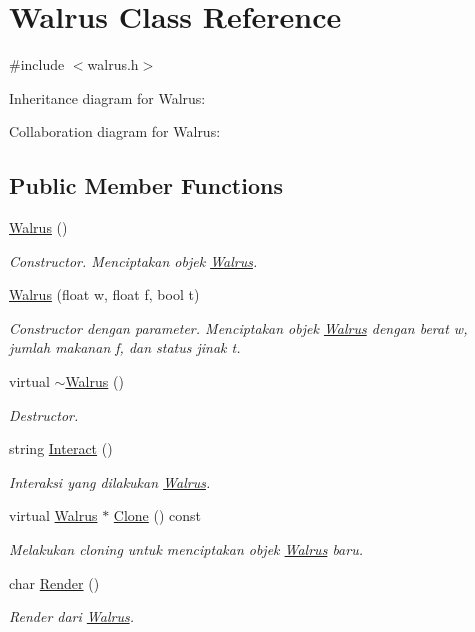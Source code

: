 \hypertarget{classWalrus}{}\section{Walrus Class Reference}
\label{classWalrus}


{\ttfamily \#include $<$walrus.\+h$>$}



Inheritance diagram for Walrus\+:


Collaboration diagram for Walrus\+:
\subsection*{Public Member Functions}
\begin{DoxyCompactItemize}
\item 
\hyperlink{classWalrus_a75c3d200b57a5c9fbcef9d8dc8247bf3}{Walrus} ()
\begin{DoxyCompactList}\small\item\em Constructor. Menciptakan objek \hyperlink{classWalrus}{Walrus}. \end{DoxyCompactList}\item 
\hyperlink{classWalrus_ad275ac9ac07871be362da7a4e180e68d}{Walrus} (float w, float f, bool t)
\begin{DoxyCompactList}\small\item\em Constructor dengan parameter. Menciptakan objek \hyperlink{classWalrus}{Walrus} dengan berat w, jumlah makanan f, dan status jinak t. \end{DoxyCompactList}\item 
virtual \hyperlink{classWalrus_a0dbf8812cdde2fecc53bee6823ff0119}{$\sim$\+Walrus} ()
\begin{DoxyCompactList}\small\item\em Destructor. \end{DoxyCompactList}\item 
string \hyperlink{classWalrus_aa21a90ecf8aff97c4cf90a59449ce02c}{Interact} ()
\begin{DoxyCompactList}\small\item\em Interaksi yang dilakukan \hyperlink{classWalrus}{Walrus}. \end{DoxyCompactList}\item 
virtual \hyperlink{classWalrus}{Walrus} $\ast$ \hyperlink{classWalrus_a9644eb3d51eb945b716bd37e25c7470e}{Clone} () const 
\begin{DoxyCompactList}\small\item\em Melakukan cloning untuk menciptakan objek \hyperlink{classWalrus}{Walrus} baru. \end{DoxyCompactList}\item 
char \hyperlink{classWalrus_a143f948e4c45e13a67f893caa435475d}{Render} ()
\begin{DoxyCompactList}\small\item\em Render dari \hyperlink{classWalrus}{Walrus}. \end{DoxyCompactList}\end{DoxyCompactItemize}
